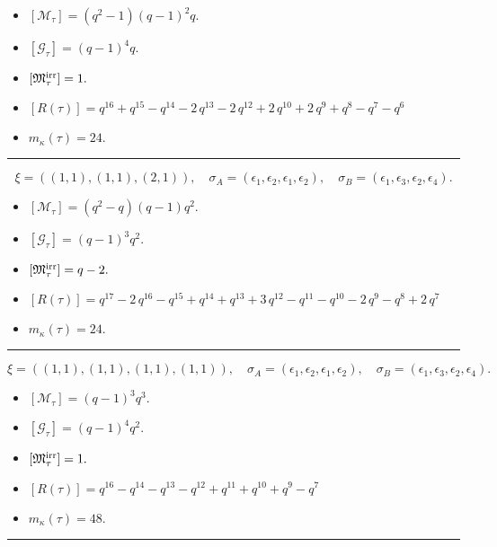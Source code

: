 \documentclass[10pt,a4paper]{amsart}
\begin{document}
\begin{itemize}
 \item $[\mathcal{M}_{\tau}] = {\left(q^{2} - 1\right)} {\left(q - 1\right)}^{2} q .$

 \item $[\mathcal{G}_{\tau}] = {\left(q - 1\right)}^{4} q .$

 \item $[{\frak M}_{\tau}^{\textrm{irr}}] = 1 .$

 \item $[R(\tau)] = q^{16} + q^{15} - q^{14} - 2 \, q^{13} - 2 \, q^{12} + 2 \, q^{10} + 2 \, q^{9} + q^{8} - q^{7} - q^{6} $

 \item $m_{\kappa}(\tau) = 24 .$

 \end{itemize}
\noindent\rule{8cm}{0.4pt}

$$\xi = ({(1, 1)}, {(1, 1)}, {(2, 1)}),\quad \sigma_A = ({{\epsilon_1}}, {{\epsilon_2}}, {{\epsilon_1, \epsilon_2}}),\quad \sigma_B = ({{\epsilon_1}}, {{\epsilon_3}}, {{\epsilon_2, \epsilon_4}}).$$

\begin{itemize}
 \item $[\mathcal{M}_{\tau}] = {\left(q^{2} - q\right)} {\left(q - 1\right)} q^{2} .$

 \item $[\mathcal{G}_{\tau}] = {\left(q - 1\right)}^{3} q^{2} .$

 \item $[{\frak M}_{\tau}^{\textrm{irr}}] = q - 2 .$

 \item $[R(\tau)] = q^{17} - 2 \, q^{16} - q^{15} + q^{14} + q^{13} + 3 \, q^{12} - q^{11} - q^{10} - 2 \, q^{9} - q^{8} + 2 \, q^{7} $

 \item $m_{\kappa}(\tau) = 24 .$

 \end{itemize}
\noindent\rule{8cm}{0.4pt}

$$\xi = ({(1, 1)}, {(1, 1)}, {(1, 1)}, {(1, 1)}),\quad \sigma_A = ({{\epsilon_1}}, {{\epsilon_2}}, {{\epsilon_1}}, {{\epsilon_2}}),\quad \sigma_B = ({{\epsilon_1}}, {{\epsilon_3}}, {{\epsilon_2}}, {{\epsilon_4}}).$$

\begin{itemize}
 \item $[\mathcal{M}_{\tau}] = {\left(q - 1\right)}^{3} q^{3} .$

 \item $[\mathcal{G}_{\tau}] = {\left(q - 1\right)}^{4} q^{2} .$

 \item $[{\frak M}_{\tau}^{\textrm{irr}}] = 1 .$

 \item $[R(\tau)] = q^{16} - q^{14} - q^{13} - q^{12} + q^{11} + q^{10} + q^{9} - q^{7} $

 \item $m_{\kappa}(\tau) = 48 .$

 \end{itemize}
\noindent\rule{9cm}{2pt}\vspace{0.2cm}
\end{document}

